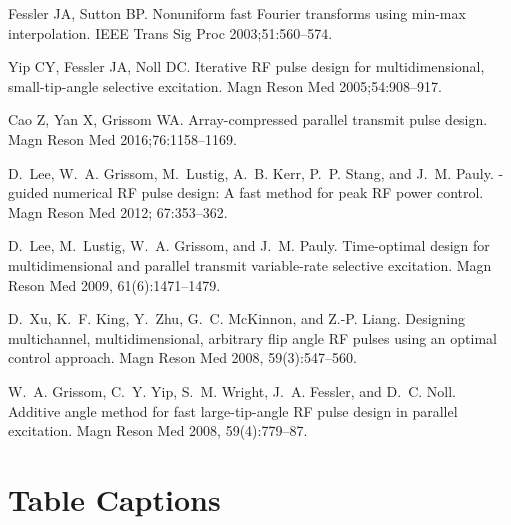 \documentclass[11pt]{article}
\begin{document}
\begin{thebibliography}{10}
Fessler JA, Sutton BP.
\newblock Nonuniform fast {Fourier} transforms using min-max interpolation.
\newblock IEEE Trans Sig Proc 2003;\hspace{0pt}51:560--574.

Yip CY, Fessler JA, Noll DC.
\newblock Iterative {RF} pulse design for multidimensional, small-tip-angle
  selective excitation.
\newblock Magn Reson Med 2005;\hspace{0pt}54:908--917.

Cao Z, Yan X, Grissom WA.
\newblock Array-compressed parallel transmit pulse design.
\newblock Magn Reson Med 2016;\hspace{0pt}76:1158--1169.

D.~Lee, W.~A. Grissom, M.~Lustig, A.~B. Kerr, P.~P. Stang, and J.~M. Pauly.
-guided numerical {RF} pulse design: A fast method for peak
  {RF} power control.
\newblock Magn Reson Med 2012; 67:353--362.

D.~Lee, M.~Lustig, W.~A. Grissom, and J.~M. Pauly.
\newblock Time-optimal design for multidimensional and parallel transmit
  variable-rate selective excitation.
\newblock Magn Reson Med 2009, 61(6):1471--1479.

D.~Xu, K.~F. King, Y.~Zhu, G.~C. McKinnon, and Z.-P. Liang.
\newblock Designing multichannel, multidimensional, arbitrary flip angle {RF}
  pulses using an optimal control approach.
\newblock Magn Reson Med 2008, 59(3):547--560.

W.~A. Grissom, C.~Y. Yip, S.~M. Wright, J.~A. Fessler, and D.~C. Noll.
\newblock Additive angle method for fast large-tip-angle {RF} pulse design in
  parallel excitation.
\newblock Magn Reson Med 2008, 59(4):779--87.





\end{thebibliography}

\pagebreak

\section*{Table Captions}

\begin{table}[!h]
\centering
\caption{$\bm{W}$ matrix sizes in gigabytes (GB) versus inclusion width in cycles/FOV. 
An inclusion width of $\infty$ corresponds to a full matrix solution.}
\label{fig:wsize}
\end{table}
\end{document}
